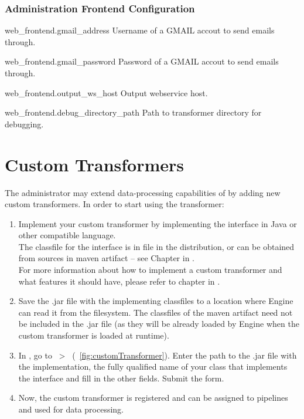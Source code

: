 \subsection*{Administration Frontend Configuration}
\begin{configlist}
	
	\item[web\_frontend.gmail\_address]
		Username of a GMAIL accout to send emails through.
		
	\item[web\_frontend.gmail\_password]
		Password of a GMAIL accout to send emails through.
		
	\item[web\_frontend.output\_ws\_host]
		Output webservice host.
		
	\item[web\_frontend.debug\_directory\_path]
		Path to transformer directory for debugging.
\end{configlist}

\chapter{Custom Transformers}
\label{chap:customTransformers}
The administrator may extend data-processing capabilities of \odcs by adding new custom transformers. In order to start using the transformer:
\begin{enumerate}
  \item Implement your custom transformer by implementing the  interface in Java or other compatible language.\\
  The classfile for the  interface is in  file in the \odcs distribution, or can be obtained from sources in  maven artifact -- see Chapter  in . \\
  For more information about how to implement a custom transformer and what features it should have, please refer to chapter  in .
  \item Save the .jar file with the implementing classfiles to a location where Engine can read it from the filesystem. The classfiles of the  maven artifact need not be included in the .jar file (as they will be already loaded by Engine when the custom transformer is loaded at runtime).
  \item In \FE, go to ~\textgreater~ (\figurename~\ref{fig:customTransformer}). Enter the path to the .jar file with the implementation, the fully qualified name of your class that implements the  interface and fill in the other fields. Submit the form.
  \item Now, the custom transformer is registered and can be assigned to pipelines and used for data processing.
\end{enumerate}

